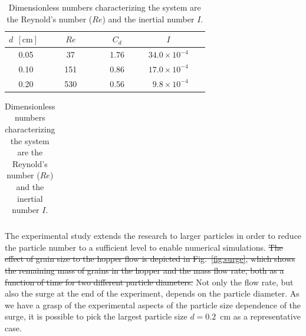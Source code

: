 \documentclass[twoside,twocolumn,9pt]{article}
\providecommand{\DIFdel}[1]{{\protect\color{red}\sout{#1}}}                      %
\providecommand{\DIFaddbegin}{} %
\providecommand{\DIFaddend}{} %
\providecommand{\DIFdelbegin}{} %
\providecommand{\DIFdelend}{} %
\newcommand{\DIFscaledelfig}{0.5}
\newlength{\DIFdelgraphicswidth} %
\newlength{\DIFdelgraphicsheight} %
\newcommand{\DIFaddincludegraphics}[2][]{{\color{blue}\fbox{\DIFOincludegraphics[#1]{#2}}}} %
\newcommand{\DIFdelincludegraphics}[2][]{%
\sbox{\DIFdelgraphicsbox}{\DIFOincludegraphics[#1]{#2}}%
\settoboxwidth{\DIFdelgraphicswidth}{\DIFdelgraphicsbox} %
\settoboxtotalheight{\DIFdelgraphicsheight}{\DIFdelgraphicsbox} %
\scalebox{\DIFscaledelfig}{%
\parbox[b]{\DIFdelgraphicswidth}{\usebox{\DIFdelgraphicsbox}\\[-\baselineskip] \rule{\DIFdelgraphicswidth}{0em}}\llap{\resizebox{\DIFdelgraphicswidth}{\DIFdelgraphicsheight}{%
\setlength{\unitlength}{\DIFdelgraphicswidth}%
\begin{picture}(1,1)%
\thicklines\linethickness{2pt} %
{\color[rgb]{1,0,0}\put(0,0){\framebox(1,1){}}}%
{\color[rgb]{1,0,0}\put(0,0){\line( 1,1){1}}}%
{\color[rgb]{1,0,0}\put(0,1){\line(1,-1){1}}}%
\end{picture}%
}\hspace*{3pt}}} %
} %
\DeclareRobustCommand{\DIFaddbegin}{\DIFOaddbegin \let\includegraphics\DIFaddincludegraphics} %
\DeclareRobustCommand{\DIFaddend}{\DIFOaddend \let\includegraphics\DIFOincludegraphics} %
\DeclareRobustCommand{\DIFdelbegin}{\DIFOdelbegin \let\includegraphics\DIFdelincludegraphics} %
\DeclareRobustCommand{\DIFdelend}{\DIFOaddend \let\includegraphics\DIFOincludegraphics} %
\begin{document}

\DIFdelend \DIFaddbegin \begin{table}[!b]
\caption{Dimensionless numbers characterizing the system are
 the Reynold's number ($Re$) and the inertial number $I$.
 }\label{tab:dimensionless}
\setlength{\extrarowheight}{2pt}
  \begin{tabular*}{0.5\textwidth}{@{\extracolsep{\fill}}cccrr}
    \hline
$d~~\mathrm{[cm]}$~	& ~~~$Re$~~~ 	& ~~~$C_d$~~~	&\multicolumn{1}{c}{~$I$~ }\\[2pt]
\hline
0.05				& 37						& 1.76		&~$34.0 \times 10^{-4}$~\\
0.10				& 151						& 0.86		&~$17.0 \times 10^{-4}$~\\
0.20				& 530						& 0.56  	&~$ 9.8 \times 10^{-4}$~\\   \hline
  \end{tabular*}

\begin{tabular}{cccrr}

\end{tabular}
\end{table}
\DIFaddend 

 

 \DIFdelbegin %


\DIFdelend The experimental study extends the research to larger particles in order
to reduce the particle number to a sufficient level to enable numerical 
simulations. 
\DIFdelbegin \DIFdel{The effect of grain size to the hopper flow is depicted in 
Fig.~\ref{fig:surge}, which shows the remaining mass of grains in the hopper
and the mass flow rate, both as a function of time for two different 
particle diameters. 
}\DIFdelend Not only the flow rate, but also the surge at the end of the experiment, 
depends on the particle diameter. As we have a grasp of the experimental 
aspects of the particle size dependence of the surge, it is possible to 
pick the largest particle size $d=0.2$~cm as a representative case.
\end{document}
